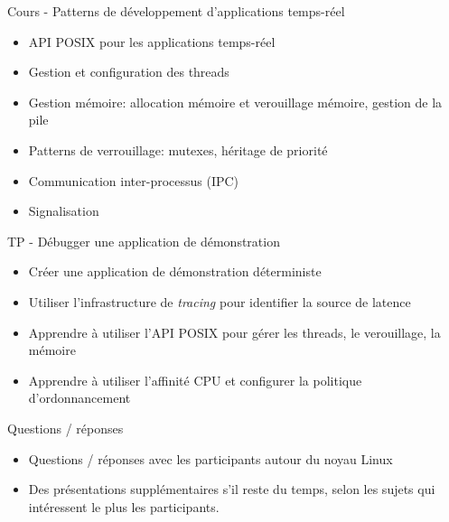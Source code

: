\documentclass[a4paper,12pt,obeyspaces,spaces,hyphens]{article}
\begin{document}
\feagendatwocolumn
{Cours - Patterns de développement d'applications temps-réel}
{
  \begin{itemize}
  \item API POSIX pour les applications temps-réel
  \item Gestion et configuration des threads
  \item Gestion mémoire: allocation mémoire et verouillage mémoire, gestion de la pile
  \item Patterns de verrouillage: mutexes, héritage de priorité
  \item Communication inter-processus (IPC)
  \item Signalisation
  \end{itemize}
}
{TP - Débugger une application de démonstration}
{
  \begin{itemize}
  \item Créer une application de démonstration déterministe
  \item Utiliser l'infrastructure de {\em tracing} pour identifier la source de latence
  \item Apprendre à utiliser l'API POSIX pour gérer les threads, le verouillage, la mémoire
  \item Apprendre à utiliser l'affinité CPU et configurer la politique d'ordonnancement
  \end{itemize}
}

\feagendaonecolumn
{Questions / réponses}
{
  \begin{itemize}
  \item Questions / réponses avec les participants autour du noyau Linux
  \item Des présentations supplémentaires s'il reste du temps, selon les sujets
	qui intéressent le plus les participants.
  \end{itemize}
}
\end{document}
